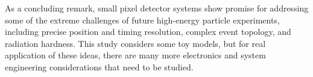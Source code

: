 \begin{refsection}
As a concluding remark, small pixel detector systems show promise for addressing some of the extreme challenges of future high-energy particle experiments, including precise position and timing resolution, complex event topology, and radiation hardness.
This study considers some toy models, but for real application of these ideas, there are many more electronics and system engineering considerations that need to be studied.

\clearpage
\printbibliography[heading=subbibliography,resetnumbers=true]
\end{refsection}